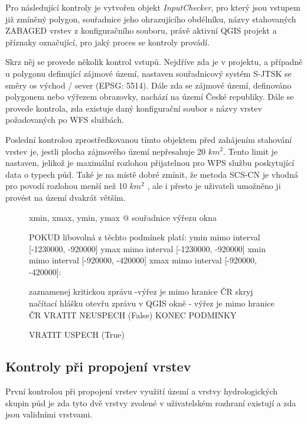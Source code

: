 \documentclass[a4paper,oneside,12pt]{book}
\begin{document}
\hspace{10mm} Pro následující kontroly je vytvořen objekt \textit{InputChecker}, pro který jsou vstupem již zmíněný polygon, souřadnice jeho ohrazujícího obdélníku, názvy stahovaných ZABAGED vrstev z konfiguračního souboru, právě aktivní QGIS projekt a příznaky označující, pro jaký proces se kontroly provádí.

\hspace{10mm} Skrz něj se provede několik kontrol vstupů. Nejdříve zda je v projektu, a případně u polygonu definující zájmové území, nastaven souřadnicový systém S-JTSK se směry os východ / sever (EPSG: 5514). Dále zda se zájmové území, definováno polygonem nebo výřezem obrazovky, nachází na území České republiky. Dále se provede kontrola,  zda existuje daný konfigurační soubor s názvy vrstev požadovaných po WFS službách. 

\hspace{10mm} Poslední kontrolou zprostředkovanou tímto objektem před zahájením stahování vrstev je, jestli plocha zájmového území nepřesahuje 20 $km^{2}$. Tento limit je nastaven, jelikož je maximální rozlohou přijatelnou pro WPS službu poskytující data o typech půd. Také je na místě dobré zmínit, že metoda SCS-CN je vhodná pro povodí rozlohou menší než 10 $km^{2}$ \cite{MNYDGwleJOjKdRUp}, ale i přesto je uživateli umožněno ji provést na území dvakrát větším.

\begin{figure}[H]
\begin{pseudocode}[style=mypseudocode, caption={Ukázka kontroly umístění zájmového území v ČR},label={kod:CR_check}]
    xmin, xmax, ymin, ymax @ souřadnice výřezu okna
    
    POKUD libovolná z těchto podmínek platí:
         ymin mimo interval [-1230000, -920000]  
         ymax mimo interval [-1230000, -920000]  
         xmin mimo interval [-920000, -420000]  
         xmax mimo interval [-920000, -420000]:
            
            zaznamenej kritickou zprávu -výřez je mimo hranice ČR
            skryj načítací hlášku
            otevřu zprávu v QGIS okně - výřez je mimo hranice ČR
            VRATIT NEUSPECH (False)
    KONEC PODMINKY
    
    VRATIT USPECH (True)
\end{pseudocode}
\end{figure}
\subsection{Kontroly při propojení vrstev} \label{intersection_checks}
\hspace{10mm}  První kontrolou při propojení vrstev využití území a vrstvy hydrologických skupin půd je zda tyto dvě vrstvy zvolené v uživatelském rozhraní existují a zda jsou validními vrstvami.
\end{document}
